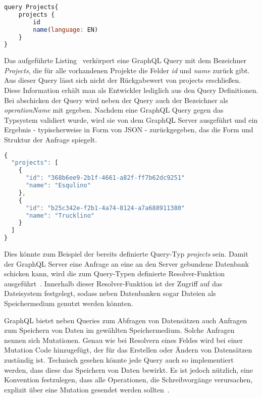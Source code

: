 \begin{lstlisting}[language=Javascript,float=h!,caption={GraphQL Query mit dem Bezeichner Projects}, label={fig:basics:graphql:5}]
query Projects{
    projects {
        id
        name(language: EN)
    }
}
\end{lstlisting}

Das aufgeführte Listing~ verkörpert eine GraphQL Query mit dem Bezeichner \emph{Projects},
die für alle vorhandenen Projekte die Felder \emph{id} und \emph{name} zurück gibt. 
Aus dieser Query lässt sich nicht der Rückgabewert von projects erschließen.
Diese Information erhält man als Entwickler lediglich aus den Query Definitionen.
Bei abschicken der Query wird neben der Query auch der 
Bezeichner als \emph{operationName} mit gegeben.
Nachdem eine GraphQL Query gegen das Typsystem validiert wurde, wird sie von dem GraphQL Server ausgeführt und
ein Ergebnis - typischerweise in Form von JSON - zurückgegeben, das die Form und Struktur der Anfrage spiegelt.

\begin{lstlisting}[language=Javascript,float=h!,caption={JSON Antwort auf die Projects Query}, label={fig:basics:graphql:6}]
{
  "projects": [
    {
      "id": "368b6ee9-2b1f-4661-a82f-ff7b62dc9251"
      "name": "Esqulino"
    },
    {
      "id": "b25c342e-f2b1-4a74-8124-a7a688911380"
      "name": "Trucklino"
    }
  ]
}
\end{lstlisting}




Dies könnte zum Beispiel der bereits definierte Query-Typ \emph{projects} sein.
Damit der GraphQL Server eine Anfrage an eine an den Server gebundene Datenbank schicken kann, wird die zum Query-Typen definierte
Resolver-Funktion ausgeführt~\cite{graphql-execution}. Innerhalb dieser Resolver-Funktion ist der Zugriff auf das Dateisystem festgelegt, sodass
neben Datenbanken sogar Dateien als Speichermedium genutzt werden könnten.

GraphQL bietet neben Queries zum Abfragen von Datensätzen auch Anfragen zum Speichern von Daten im gewählten Speichermedium. Solche Anfragen nennen sich Mutationen. Genau wie bei Resolvern eines Feldes wird bei einer Mutation Code hinzugefügt, der  für das Erstellen oder Ändern von Datensätzen zuständig ist. Technisch gesehen könnte jede Query auch so implementiert werden, dass diese das Speichern von Daten bewirkt. Es ist jedoch nützlich, eine Konvention festzulegen, dass alle Operationen, die Schreibvorgänge verursachen, explizit über eine Mutation gesendet werden sollten~\cite{graphql-mutations}.

